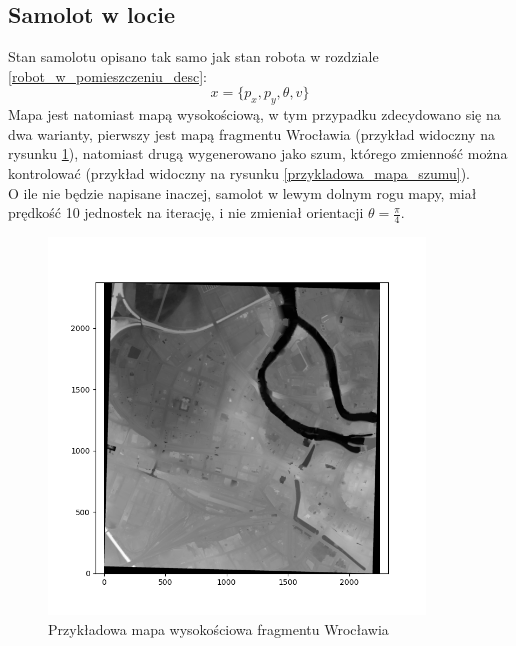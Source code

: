 \subsection{Samolot w locie}
Stan samolotu opisano tak samo jak stan robota w rozdziale \ref{robot_w_pomieszczeniu_desc}:
\begin{equation*}
	x = \{p_x,p_y,\theta,v\}
\end{equation*}
Mapa jest natomiast mapą wysokościową, w tym przypadku zdecydowano się na dwa warianty, pierwszy jest mapą fragmentu Wrocławia (przykład widoczny na rysunku \ref{przykladowa_mapa_wroclawia}), natomiast drugą wygenerowano jako szum, którego zmienność można kontrolować (przykład widoczny na rysunku \ref{przykladowa_mapa_szumu}).\\
O ile nie będzie napisane inaczej, samolot w lewym dolnym rogu mapy, miał prędkość 10 jednostek na iterację, i nie zmieniał orientacji $\theta=\frac{\pi}{4}$.
\begin{figure}[H]
	\begin{center}
		\includegraphics[width=10cm]{./przykladowa_mapa_wroclawia.png}
		\caption{Przykładowa mapa wysokościowa fragmentu Wrocławia}
		\label{przykladowa_mapa_wroclawia}
	\end{center}
\end{figure}
